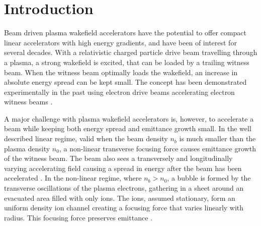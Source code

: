 \documentclass[aps,prstab,reprint,amsmath,amssymb,groupedaddress]{revtex4-1}
\begin{document}
\maketitle

\section{Introduction}\label{S:I}

Beam driven plasma wakefield accelerators \cite{chen:1985} have the potential to offer compact linear accelerators with
high energy gradients, and have been of interest for several decades. With a relativistic charged particle drive
beam travelling through a plasma, a strong wakefield is excited, that can be loaded by a trailing witness beam. When the
witness beam optimally loads the wakefield, an increase in absolute energy spread can be kept small. %
The concept has been demonstrated experimentally in the past using electron drive beams accelerating electron witness
beams \cite{rosenzweig:1988, blumenfeld:2007, kallos:2008, litos:2014}. 

A major challenge with plasma wakefield accelerators is, however, to accelerate a beam while keeping both energy spread
and emittance growth small. %
In the well described linear regime, valid when the beam density $n_{b}$ is much smaller than the plasma density
$n_{0}$, a non-linear transverse focusing force causes emittance growth of the witness beam. The beam
also sees a transversely and longitudinally varying accelerating field causing a spread in energy after the beam has
been accelerated \cite{katsouleas:1987}. In the non-linear regime, where $n_{b} > n_{0}$, a bubble is formed by the
transverse oscillations of the plasma electrons, %
gathering in a sheet around an evacuated area filled with only ions. The ions, assumed stationary, form an uniform
density ion channel creating a focusing force that varies linearly with radius. This %
focusing force %
preserves emittance \cite{rosenzweig:1991}.
\end{document}
